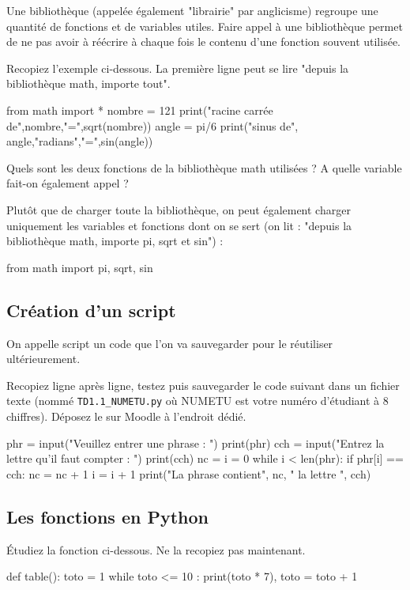 Une bibliothèque (appelée également "librairie" par anglicisme) regroupe une quantité de fonctions et de
variables utiles. Faire appel à une bibliothèque permet de ne pas avoir à réécrire à chaque fois le contenu d'une fonction souvent utilisée.

 Recopiez l'exemple ci-dessous. La première ligne peut se lire "depuis la bibliothèque math, importe tout".

\begin{python}
from math import *
nombre = 121
print("racine carrée de",nombre,"=",sqrt(nombre))
angle = pi/6
print("sinus de", angle,"radians","=",sin(angle))
\end{python}

Quels sont les deux fonctions de la bibliothèque math utilisées ? A quelle variable fait-on également appel ?

Plut\^ot que de charger toute la bibliothèque, on peut également charger uniquement les variables et fonctions dont on se sert (on lit : "depuis la bibliothèque math, importe pi, sqrt et sin") :


\begin{python}
from math import pi, sqrt, sin
\end{python}


\subsection*{Création d'un script}

On appelle script un code que l'on va sauvegarder pour le réutiliser ultérieurement.

Recopiez ligne après ligne, testez puis sauvegarder le code suivant dans un fichier texte (nommé \texttt{TD1.1\_NUMETU.py} où NUMETU est votre numéro d'étudiant à 8 chiffres). Déposez le sur Moodle à l'endroit dédié.
\begin{python}
phr = input("Veuillez entrer une phrase : ")
print(phr)
cch = input("Entrez la lettre qu'il faut compter : ")
print(cch)
nc = i = 0
while i < len(phr):
  if phr[i] == cch:
    nc = nc + 1
  i = i + 1
print("La phrase contient", nc, " la lettre ", cch)
\end{python}


\subsection*{Les fonctions en Python}


 \'Etudiez la fonction ci-dessous. Ne la recopiez pas maintenant.
\begin{python}
def table():
  toto = 1
  while toto <= 10 :
    print(toto * 7),
    toto = toto + 1
\end{python}

